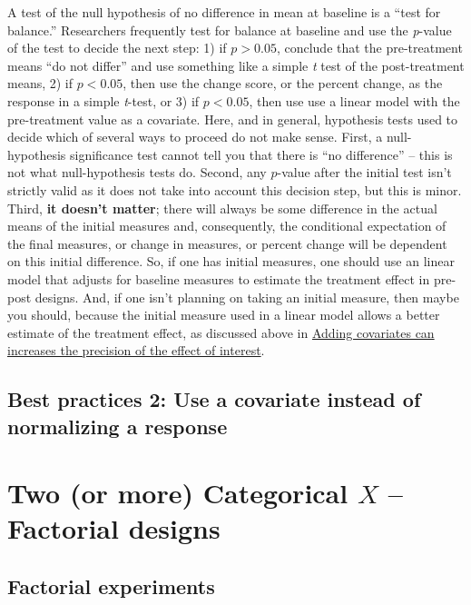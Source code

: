\documentclass[]{book}
\begin{document}
A test of the null hypothesis of no difference in mean at baseline is a
``test for balance.'' Researchers frequently test for balance at
baseline and use the \emph{p}-value of the test to decide the next step:
1) if \(p > 0.05\), conclude that the pre-treatment means ``do not
differ'' and use something like a simple \emph{t} test of the
post-treatment means, 2) if \(p < 0.05\), then use the change score, or
the percent change, as the response in a simple \emph{t}-test, or 3) if
\(p < 0.05\), then use use a linear model with the pre-treatment value
as a covariate. Here, and in general, hypothesis tests used to decide
which of several ways to proceed do not make sense. First, a
null-hypothesis significance test cannot tell you that there is ``no
difference'' -- this is not what null-hypothesis tests do. Second, any
\(p\)-value after the initial test isn't strictly valid as it does not
take into account this decision step, but this is minor. Third,
\textbf{it doesn't matter}; there will always be some difference in the
actual means of the initial measures and, consequently, the conditional
expectation of the final measures, or change in measures, or percent
change will be dependent on this initial difference. So, if one has
initial measures, one should use an linear model that adjusts for
baseline measures to estimate the treatment effect in pre-post designs.
And, if one isn't planning on taking an initial measure, then maybe you
should, because the initial measure used in a linear model allows a
better estimate of the treatment effect, as discussed above in
\protect\hyperlink{adding-covariates-can-increases-the-precision-of-the-effect-of-interest}{Adding
covariates can increases the precision of the effect of interest}.

\section{Best practices 2: Use a covariate instead of normalizing a
response}\label{best-practices-2-use-a-covariate-instead-of-normalizing-a-response}

\chapter{\texorpdfstring{Two (or more) Categorical \(X\) -- Factorial
designs}{Two (or more) Categorical X -- Factorial designs}}\label{two-or-more-categorical-x-factorial-designs}

\section{Factorial experiments}\label{factorial-experiments}
\end{document}
